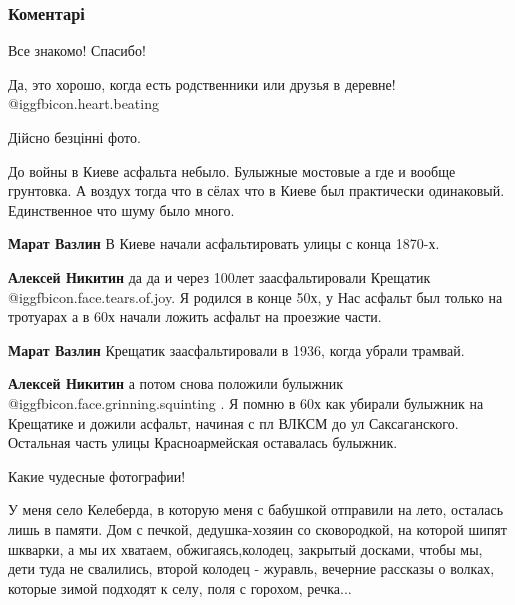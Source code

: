  
 
 
 
 
\subsubsection{Коментарі}

\begin{itemize} %

Все знакомо! Спасибо!

Да, это хорошо, когда есть родственники или друзья в деревне! @igg{fbicon.heart.beating} 

Дійсно безцінні фото.


До войны в Киеве асфальта небыло. Булыжные мостовые а где и вообще грунтовка. А
воздух тогда что в сёлах что в Киеве был практически одинаковый. Единственное
что шуму было много.

\begin{itemize} %
\textbf{Марат Вазлин} В Киеве начали асфальтировать улицы с конца 1870-х.

\textbf{Алексей Никитин} да да и через 100лет заасфальтировали Крещатик  @igg{fbicon.face.tears.of.joy}. Я родился в конце 50х, у Нас асфальт был только на тротуарах а в 60х начали ложить асфальт на проезжие части.

\textbf{Марат Вазлин} Крещатик заасфальтировали в 1936, когда убрали трамвай.

\textbf{Алексей Никитин} а потом снова положили булыжник  @igg{fbicon.face.grinning.squinting} . Я помню в 60х как убирали булыжник на Крещатике и дожили асфальт, начиная с пл ВЛКСМ до ул Саксаганского. Остальная часть улицы Красноармейская оставалась булыжник.
\end{itemize} %


Какие чудесные фотографии!

У меня село Келеберда, в которую меня с бабушкой отправили на лето, осталась
лишь в памяти. Дом с печкой, дедушка-хозяин со сковородкой, на которой шипят
шкварки, а мы их хватаем, обжигаясь,колодец, закрытый досками, чтобы мы, дети
туда не свалились, второй колодец - журавль, вечерние рассказы о волках,
которые зимой подходят к селу, поля с горохом, речка...


\end{itemize}
